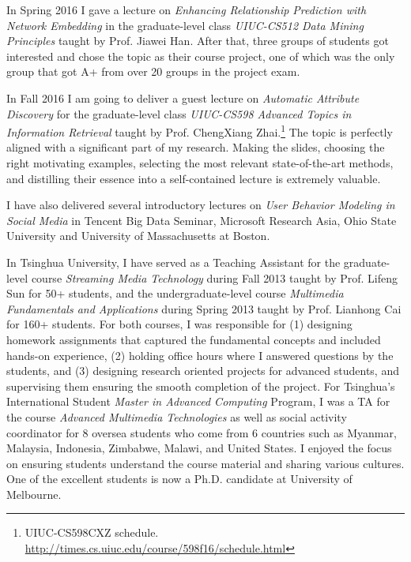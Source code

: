\documentclass[10.5pt]{article}
\begin{document}
In Spring 2016 I gave a lecture on \textit{Enhancing Relationship Prediction with Network Embedding} in the graduate-level class \textit{UIUC-CS512 Data Mining Principles} taught by Prof. Jiawei Han. After that, three groups of students got interested and chose the topic as their course project, one of which was the only group that got A+ from over 20 groups in the project exam.

In Fall 2016 I am going to deliver a guest lecture on \textit{Automatic Attribute Discovery} for the graduate-level class \textit{UIUC-CS598 Advanced Topics in Information Retrieval} taught by Prof. ChengXiang Zhai.\footnote{UIUC-CS598CXZ schedule. \url{http://times.cs.uiuc.edu/course/598f16/schedule.html}} The topic is perfectly aligned with a significant part of my research. Making the slides, choosing the right motivating examples, selecting the most relevant state-of-the-art methods, and distilling their essence into a self-contained lecture is extremely valuable.

I have also delivered several introductory lectures on \textit{User Behavior Modeling in Social Media} in Tencent Big Data Seminar, Microsoft Research Asia, Ohio State University and University of Massachusetts at Boston.

\vskip 0.04in
\vskip 0.02in

In Tsinghua University, I have served as a Teaching Assistant for the graduate-level course \textit{Streaming Media Technology} during Fall 2013 taught by Prof. Lifeng Sun for 50+ students, and the undergraduate-level course \textit{Multimedia Fundamentals and Applications} during Spring 2013 taught by Prof. Lianhong Cai for 160+ students. For both courses, I was responsible for (1) designing homework assignments that captured the fundamental concepts and included hands-on experience, (2) holding office hours where I answered questions by the students, and (3) designing research oriented projects for advanced students, and supervising them ensuring the smooth completion of the project. For Tsinghua's International Student \textit{Master in Advanced Computing} Program, I was a TA for the course \textit{Advanced Multimedia Technologies} as well as social activity coordinator for 8 oversea students who come from 6 countries such as Myanmar, Malaysia, Indonesia, Zimbabwe, Malawi, and United States. I enjoyed the focus on ensuring students understand the course material and sharing various cultures. One of the excellent students is now a Ph.D. candidate at University of Melbourne.
\end{document}

